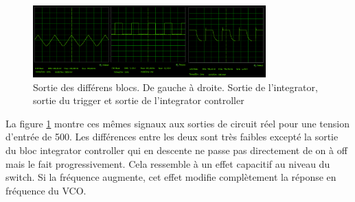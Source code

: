 \begin{figure}[ht]                                       
	\centering
	\includegraphics[width=0.8\textwidth]{img/vco_real_out.png}
	\caption{Sortie des différens blocs. De gauche à droite. Sortie de l'integrator, sortie du trigger et sortie de l'integrator controller}
	\label{fig:out_vco_real}
\end{figure}
La figure \ref{fig:out_vco_real} montre ces mêmes signaux aux sorties de circuit réel pour une tension d'entrée de \unit{500}{\milli\volt}. Les différences entre les deux sont très faibles excepté la sortie du bloc integrator controller qui en descente ne passe pas directement de on à off mais le fait progressivement. Cela ressemble à un effet capacitif au niveau du switch. Si la fréquence augmente, cet effet modifie complètement la réponse en fréquence du VCO.

